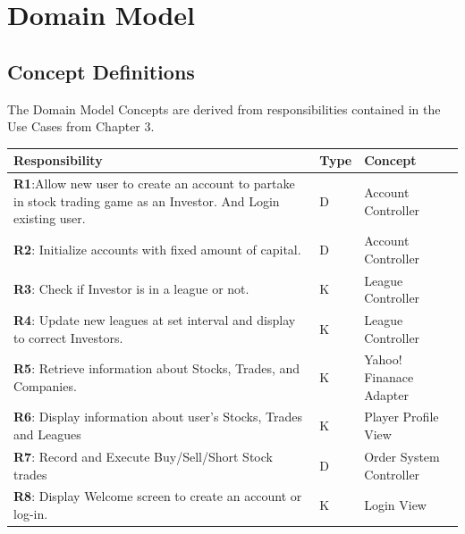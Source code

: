 \chapter{Domain Model}

\section{Concept Definitions}

The Domain Model Concepts are derived from responsibilities contained in the
Use Cases from Chapter 3.



\begin{centering}
\renewcommand\arraystretch{1.3}
\label{UC-3}
\begin{longtable}{|p{4in}| p{.4in}| p{1.5in} |}
\hline
\bfseries{\color{color1}Responsibility} &
          \bfseries{\color{color1}Type} &
          \bfseries{\color{color1}Concept} \\ \hline
          \textbf{R1}:Allow new user to create an account to partake in stock trading game
          as an Investor. And Login existing user. &
                                                 D & Account Controller \\ \hline

          \textbf{R2}: Initialize accounts with fixed amount of capital. &
                     D & Account Controller \\ \hline
          \textbf{R3}: Check if Investor is in a league or not. & K & League Controller \\ \hline
          \textbf{R4}: Update new leagues at set interval and display to correct Investors. & K
                                             & League Controller \\ \hline
          \textbf{R5}: Retrieve information about Stocks, Trades, and Companies. & K
                                             & Yahoo! Finanace Adapter \\ \hline
          \textbf{R6}: Display information about user’s Stocks, Trades and Leagues & K
                                             & Player Profile View \\ \hline
           \textbf{R7}: Record and Execute Buy/Sell/Short Stock trades & D
                                              & Order System Controller \\ \hline
          \textbf{R8}: Display Welcome screen to create an account or log-in. & K &
                                                Login View \\ \hline

\end{longtable}
\end{centering}

